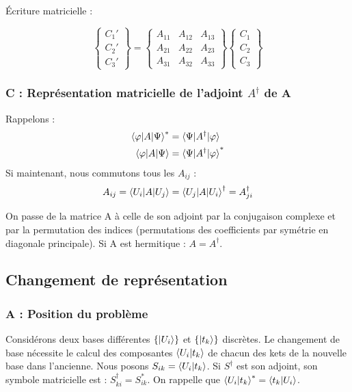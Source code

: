 \documentclass[12pt,a4paper,titlepage]{book}
\begin{document}
Écriture matricielle :

\begin{center}
\[
\left\lbrace
\begin{matrix}
C_{1}'\\
C_{2}'\\
C_{3}'
\end{matrix}
\right\rbrace = \left\lbrace
\begin{matrix}
A_{11} & A_{12} & A_{13}\\
A_{21} & A_{22} & A_{23}\\
A_{31} & A_{32} & A_{33}
\end{matrix}
\right\rbrace \left\lbrace
\begin{matrix}
C_1\\
C_2\\
C_3
\end{matrix}
\right\rbrace
\]
\end{center}

\subsubsection{C : Représentation matricielle de l'adjoint $A^{\dagger}$ de A}

Rappelons :
\begin{align*}
\braket{\varphi | A | \Psi}^* &= \braket{\Psi | A^{\dagger} | \varphi}\\
\braket{\varphi | A | \Psi} &= \braket{\Psi | A^{\dagger} | \varphi}^*
\end{align*}
Si maintenant, nous commutons tous les $A_{ij}$ :
\begin{equation*}
A_{ij} = \braket{U_i | A | U_j} = \braket{U_j | A | U_i}^{\dagger} = A_{ji}^{\dagger}
\end{equation*}

On passe de la matrice A à celle de son adjoint par la conjugaison complexe et par la permutation des indices (permutations des coefficients par symétrie en diagonale principale). Si A est hermitique : $A = A^{\dagger}$.

\subsection{Changement de représentation}
\subsubsection{A : Position du problème}

Considérons deux bases différentes $\left\lbrace \ket{U_i} \right\rbrace$ et $\left\lbrace \ket{t_k} \right\rbrace$ discrètes. Le changement de base nécessite le calcul des composantes $\braket{U_i | t_k}$ de chacun des kets de la nouvelle base dans l'ancienne. Nous posons $S_{ik} = \braket{U_i | t_k}$. Si $S^{\dagger}$ est son adjoint, son symbole matricielle est : $S_{ki}^{\dagger} = S_{ik}^{*}$. On rappelle que $\braket{U_i | t_k}^{*} = \braket{t_k | U_i}$.
\end{document}
